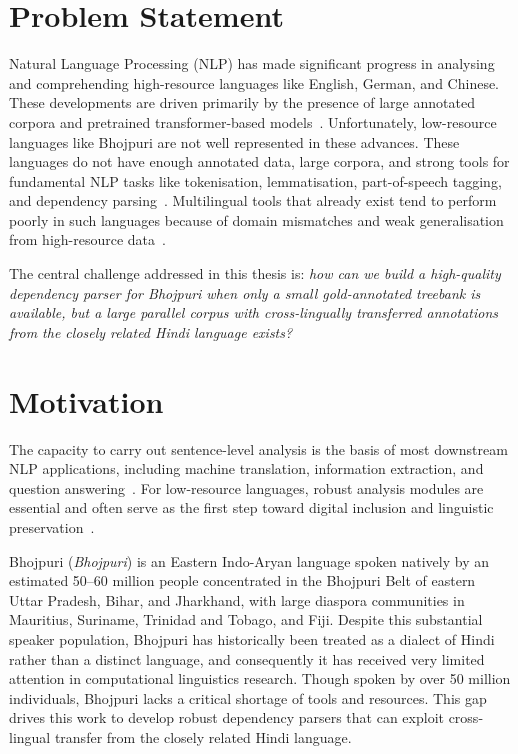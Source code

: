 \documentclass[12pt,a4paper,oneside]{report}
\newcommand{\bho}{Bhojpuri}
\newcommand{\hi}{Hindi}
\begin{document}
\section{Problem Statement}

Natural Language Processing (NLP) has made significant progress in analysing and
comprehending high-resource languages like English, German, and Chinese. These
developments are driven primarily by the presence of large annotated corpora and
pretrained transformer-based models~\citep{devlin2019bert,conneau2020xlmr}.
Unfortunately, low-resource languages like \bho{} are not well represented in these
advances. These languages do not have enough annotated data, large corpora, and
strong tools for fundamental NLP tasks like tokenisation, lemmatisation,
part-of-speech tagging, and dependency parsing~\citep{bhtb2022}. Multilingual tools
that already exist tend to perform poorly in such languages because of domain
mismatches and weak generalisation from high-resource data~\citep{conneau2020xlmr}.

The central challenge addressed in this thesis is: \textit{how can we build a
high-quality dependency parser for \bho{} when only a small gold-annotated treebank
is available, but a large parallel corpus with cross-lingually transferred annotations
from the closely related \hi{} language exists?}

\section{Motivation}

The capacity to carry out sentence-level analysis is the basis of most downstream NLP
applications, including machine translation, information extraction, and question
answering~\citep{jurafsky2023}. For low-resource languages, robust analysis modules
are essential and often serve as the first step toward digital inclusion and linguistic
preservation~\citep{bhtb2022}.

\bho{} (\textit{Bhojpuri}) is an Eastern Indo-Aryan language spoken natively by an
estimated 50--60 million people concentrated in the Bhojpuri Belt of eastern Uttar
Pradesh, Bihar, and Jharkhand, with large diaspora communities in Mauritius,
Suriname, Trinidad and Tobago, and Fiji. Despite this substantial speaker population,
\bho{} has historically been treated as a dialect of \hi{} rather than a distinct
language, and consequently it has received very limited attention in computational
linguistics research. Though spoken by over 50 million individuals, \bho{} lacks a
critical shortage of tools and resources. This gap drives this work to develop robust
dependency parsers that can exploit cross-lingual transfer from the closely related
\hi{} language.
\end{document}

